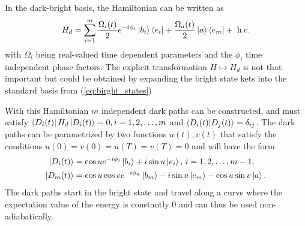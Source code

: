 In the dark-bright basis, the Hamiltonian can be written as
\begin{equation}
H_d = \sum_{i = 1}^m \frac{\Omega_i(t)}{2}e^{-i\phi_i}\ket{b_i}\bra{e_i} + \frac{\Omega_a(t)}{2}\ket{a}\bra{e_m} +\;\text{h.c}.
\label{eq:HamdN}
\end{equation}
with $\Omega_i$ being real-valued time dependent parameters and the $\phi_i$ time independent phase factors. The explicit transformation $H \mapsto H_d$ is not that important but could be obtained by expanding the bright state kets into the standard basis from (\ref{eq:birght_states})

With this Hamiltonian $m$ independent dark paths can be constructed, and must satisfy $\bra{D_i(t)}H_d\ket{D_i(t)} = 0, i = 1,2,\dots,m$ and $\bra{D_i(t)}\ket{D_j(t)} = \delta_{ij}$. The dark paths can be parametrized by two functions $u(t),v(t)$ that satisfy the conditions $u(0) = v(0) = u(T) = v(T) = 0$ and  will have the form
\begin{equation}
\begin{aligned}
\ket{D_i(t)} &= \cos u e^{-i\phi_i}\ket{b_i} + i\sin u \ket{e_i},\, i = 1,2,\dots,m-1,
\\
\ket{D_m(t)} &= \cos u \cos v e^{-i\phi_n}\ket{b_m} - i\sin u \ket{e_m} - \cos u \sin v \ket{a}.
\end{aligned}
\end{equation}
The dark paths start in the bright state and travel along a curve where the expectation value of the energy is constantly $0$ and can thus be used non-adiabatically.

